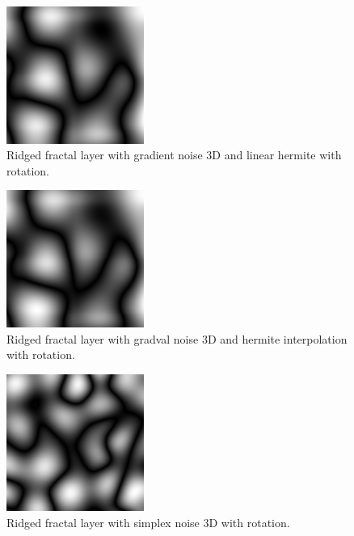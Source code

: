 \begin{figure}[h]
\centering
\includegraphics[width=0.4\textwidth]{out/simpleRidgedLayer3/simpleRidgedLayer3_gradient_noise3D_hermiteInterp_rot.png}
\caption{Ridged fractal layer with gradient noise 3D and linear hermite with rotation.}
\label{fig:ridged_fractal_layer3_gradient_noise3D_hermiteInterp_rot}
\end{figure}

\begin{figure}[h]
\centering
\includegraphics[width=0.4\textwidth]{out/simpleRidgedLayer3/simpleRidgedLayer3_gradval_noise3D_hermiteInterp_rot.png}
\caption{Ridged fractal layer with gradval noise 3D and hermite interpolation with rotation.}
\label{fig:ridged_fractal_layer3_gradval_noise3D_hermiteInterp_rot}
\end{figure}

\begin{figure}[h]
\centering
\includegraphics[width=0.4\textwidth]{out/simpleRidgedLayer3/simpleRidgedLayer3_simplex_noise3D_noInterp_rot.png}
\caption{Ridged fractal layer with simplex noise 3D with rotation.}
\label{fig:ridged_fractal_layer3_simplex_noise3D_noInterp_rot}
\end{figure}

